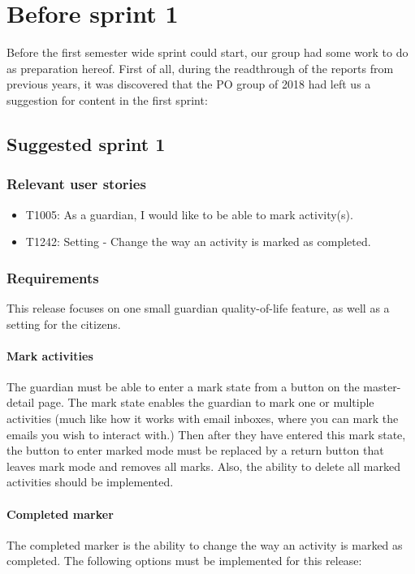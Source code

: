 \section{Before sprint 1}
Before the first semester wide sprint could start, our group had some work to do as preparation hereof.
First of all, during the readthrough of the reports from previous years, it was discovered that the PO group of 2018 had left us a suggestion for content in the first sprint:

\subsection*{Suggested sprint 1}
\subsubsection*{Relevant user stories}
\begin{itemize}
    \item T1005: As a guardian, I would like to be able to mark activity(s). 
    \item T1242: Setting - Change the way an activity is marked as completed. 
\end{itemize}

\subsubsection{Requirements}
This release focuses on one small guardian quality-of-life feature, as well as a setting for the citizens.

\paragraph{Mark activities}
The guardian must be able to enter a mark state from a button on the master-detail page. The mark state enables the guardian to mark one or multiple activities (much like how it works with email inboxes, where you can mark the emails you wish to interact with.) Then after they have entered this mark state, the button to enter marked mode must be replaced by a return button that leaves mark mode and removes all marks. Also, the ability to delete all marked activities should be implemented.

\paragraph{Completed marker}
The completed marker is the ability to change the way an activity is marked as completed. The following options must be implemented for this release:

